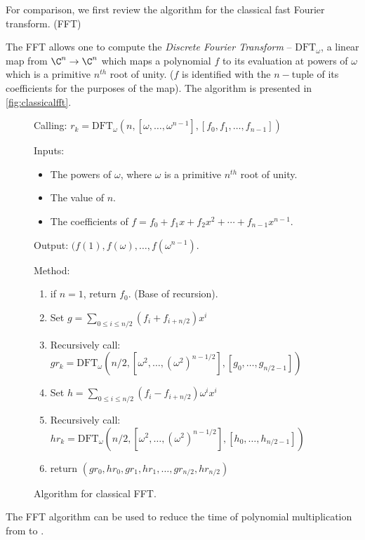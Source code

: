 For comparison, we first review the algorithm for the classical
fast Fourier transform. (FFT) 

The FFT allows one to compute the \emph{Discrete Fourier Transform} -- 
$\mbox{DFT}_\omega$, a linear map from $\C^n \rightarrow \C^n$
which maps a polynomial $f$ to its evaluation at powers of $\omega$ which 
is a primitive $n^{th}$ root of unity. ($f$ is identified with the 
$n-$tuple of its coefficients for the purposes of the map). The algorithm is
presented in \vref{fig:classicalfft}.

\begin{figure}
\begin{description}
\item{Calling:} $r_k = \mbox{DFT}_\omega(n, [\omega, \ldots, \omega^{n-1}], [f_0, f_1, \ldots, f_{n-1}])$
\item{Inputs:} \begin{itemize}
\item{} The powers of $\omega$, where $\omega$ is a primitive  $n^{th}$ root of unity.
\item{} The value of $n$.
\item{} The coefficients of $f=f_0+f_1x+f_2x^2+\cdots+f_{n-1}x^{n-1}$.
\end{itemize}
\item{Output: } $(f(1), f(\omega), \ldots , f(\omega^{n-1})$.
\item{Method: } \begin{enumerate}
\item{} if $n=1$, return $f_0$. (Base of recursion).
\item{} Set $g=\sum_{0\le i \le n/2}(f_i + f_{i+n/2})x^i$
\item{} Recursively call: $gr_k = \mbox{DFT}_\omega(n/2, [\omega^2, \ldots, (\omega^2)^{n-1/2}], [g_0, \ldots, g_{n/2-1}])$
\item{} Set $h=\sum_{0\le i \le n/2}(f_i - f_{i+n/2})\omega^i x^i$
\item{} Recursively call: $hr_k = \mbox{DFT}_\omega(n/2, [\omega^2, \ldots, (\omega^2)^{n-1/2}], [h_0, \ldots, h_{n/2-1}])$
\item{} return $(gr_0, hr_0, gr_1, hr_1, \ldots, gr_{n/2}, hr_{n/2})$
\end{enumerate}
\end{description}
\caption{Algorithm for classical FFT.}\label{fig:classicalfft}
\end{figure}

The FFT algorithm can be used to reduce the time of polynomial multiplication
from  to . 
